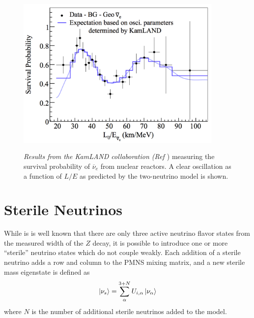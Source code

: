 \begin{figure}[ht!]
\centering
	\includegraphics[width=0.9\textwidth]{Figures/KAMLANDfig.png} \\
\caption{\textit{Results from the KamLAND collaboration (Ref \protect\cite{KAMLANDsource}}) measuring the survival probability of $\overline{\nu}_e$ from nuclear reactors. A clear oscillation as a function of $L/E$ as predicted by the two-neutrino model is shown.}\label{KAMLANDfig}
\end{figure}


\section{Sterile Neutrinos}
While is is well known that there are only three active neutrino flavor states from the measured width of the $Z$ decay, it is possible to introduce one or more ``sterile'' neutrino states which do not couple weakly. Each addition of a sterile neutrino adds a row and column to the PMNS mixing matrix, and a new sterile mass eigenstate is defined as
\begin{equation}\label{sterilenuPMNSmixeqtn}
\Ket{\nu_s} = \sum_\alpha^{3+N} U_{i,\alpha}\Ket{\nu_\alpha}
\end{equation}
where $N$ is the number of additional sterile neutrinos added to the model.\\


